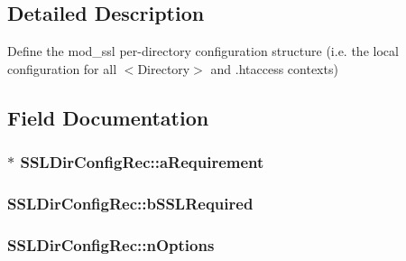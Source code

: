 \subsection{Detailed Description}
Define the mod\+\_\+ssl per-\/directory configuration structure (i.\+e. the local configuration for all $<$Directory$>$ and .htaccess contexts) 

\subsection{Field Documentation}
\subsubsection[{\texorpdfstring{a\+Requirement}{aRequirement}}]{$\ast$ S\+S\+L\+Dir\+Config\+Rec\+::a\+Requirement}\hypertarget{structSSLDirConfigRec_ad4e8ef58d36e34c0bcf451c9d445ca75}{}\label{structSSLDirConfigRec_ad4e8ef58d36e34c0bcf451c9d445ca75}
\subsubsection[{\texorpdfstring{b\+S\+S\+L\+Required}{bSSLRequired}}]{ S\+S\+L\+Dir\+Config\+Rec\+::b\+S\+S\+L\+Required}\hypertarget{structSSLDirConfigRec_a00aa1231f0f2ac4bee71e57200c25bca}{}\label{structSSLDirConfigRec_a00aa1231f0f2ac4bee71e57200c25bca}
\subsubsection[{\texorpdfstring{n\+Options}{nOptions}}]{ S\+S\+L\+Dir\+Config\+Rec\+::n\+Options}\hypertarget{structSSLDirConfigRec_a50695711c7c4fca0eddbb421e8620b61}{}\label{structSSLDirConfigRec_a50695711c7c4fca0eddbb421e8620b61}
